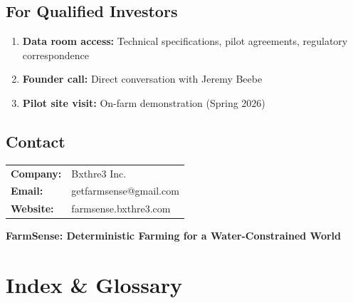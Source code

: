 \documentclass[10pt]{article}
\begin{document}
\subsection{For Qualified Investors}

\begin{enumerate}
    \item \textbf{Data room access:} Technical specifications, pilot agreements, regulatory correspondence
    \item \textbf{Founder call:} Direct conversation with Jeremy Beebe
    \item \textbf{Pilot site visit:} On-farm demonstration (Spring 2026)
\end{enumerate}

\subsection{Contact}

\begin{tabular}{@{}ll@{}}
\textbf{Company:} & Bxthre3 Inc. \\
\textbf{Email:} & getfarmsense@gmail.com \\
\textbf{Website:} & farmsense.bxthre3.com \\
\end{tabular}

\vspace{0.5in}

\begin{center}
\color{farmsense-green}\Large\bfseries
FarmSense: Deterministic Farming for a Water-Constrained World
\end{center}

\newpage

\section*{Index \& Glossary}
\end{document}
